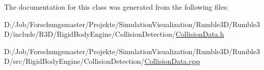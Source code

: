 The documentation for this class was generated from the following files\+:\begin{DoxyCompactItemize}
\item 
D\+:/\+Job/\+Forschungsmaster/\+Projekte/\+Simulation\+Visualization/\+Rumble3\+D/\+Rumble3\+D/include/\+R3\+D/\+Rigid\+Body\+Engine/\+Collision\+Detection/\mbox{\hyperlink{_collision_data_8h}{Collision\+Data.\+h}}\item 
D\+:/\+Job/\+Forschungsmaster/\+Projekte/\+Simulation\+Visualization/\+Rumble3\+D/\+Rumble3\+D/src/\+Rigid\+Body\+Engine/\+Collision\+Detection/\mbox{\hyperlink{_collision_data_8cpp}{Collision\+Data.\+cpp}}\end{DoxyCompactItemize}
